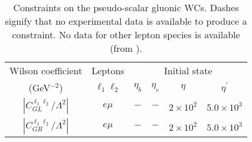 \documentclass[12pt]{article}
\begin{document}
\begin{table*}
\begin{center}
\footnotesize
\begin{tabular}{cccccc}
\hline \hline
Wilson coefficient & Leptons &\multicolumn{4}{c}{Initial state} \\
(GeV$^{-2}$) & $\ell_1 \ell_2$ & $\eta_b$ & $\eta_c$ & $\eta$ & $\eta^{\prime}$ \\
\hline
%
$\left| C_{GL}^{\ell_1\ell_2}/\Lambda^2 \right|$  & $e \mu$ & $-$ & $-$ & $2 \times 10^2$  & $5.0 \times 10^{3}$ \vspace{0.1cm} \\
$\left| C_{GR}^{\ell_1\ell_2}/{\Lambda^2} \right|$ & $e \mu$ & $-$ & $-$ & $2 \times 10^2$ & $5.0 \times 10^{3}$ \vspace{0.1cm} \\
\hline \hline
\end{tabular}
\end{center}
\caption{\label{tab:Pgluon} Constraints on the pseudo-scalar gluonic WCs. Dashes signify that 
no experimental data is available to produce a constraint. No data for other lepton species is available (from \cite{Hazard:2016fnc}).}
\end{table*}
%
\end{document}
